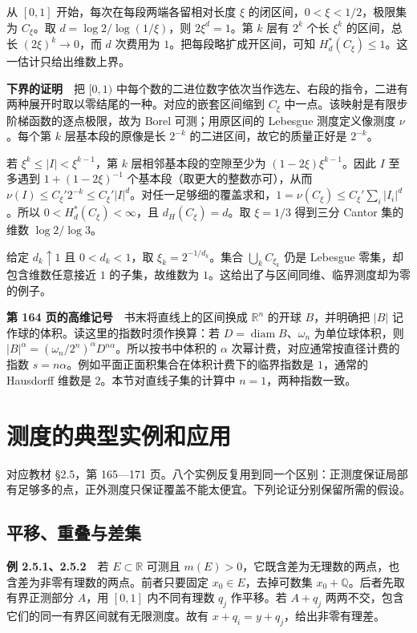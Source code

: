 \documentclass[11pt,a4paper]{article}
\begin{document}
从 \([0,1]\) 开始，每次在每段两端各留相对长度 \(\xi\) 的闭区间，\(0<\xi<1/2\)，极限集为 \(C_\xi\)。取 \(d=\log2/\log(1/\xi)\)，则 \(2\xi^d=1\)。第 \(k\) 层有 \(2^k\) 个长 \(\xi^k\) 的区间，总长 \((2\xi)^k\to0\)，而 \(d\) 次费用为 \(1\)。把每段略扩成开区间，可知 \(H^*_d(C_\xi)\leq1\)。这一估计只给出维数上界。

\textbf{下界的证明}　把 \([0,1)\) 中每个数的二进位数字依次当作选左、右段的指令，二进有两种展开时取以零结尾的一种。对应的嵌套区间缩到 \(C_\xi\) 中一点。该映射是有限步阶梯函数的逐点极限，故为 Borel 可测；用原区间的 Lebesgue 测度定义像测度 \(\nu\)。每个第 \(k\) 层基本段的原像是长 \(2^{-k}\) 的二进区间，故它的质量正好是 \(2^{-k}\)。

若 \(\xi^k\leq |I|<\xi^{k-1}\)，第 \(k\) 层相邻基本段的空隙至少为 \((1-2\xi)\xi^{k-1}\)。因此 \(I\) 至多遇到 \(1+(1-2\xi)^{-1}\) 个基本段（取更大的整数亦可），从而 \(\nu(I)\leq C_\xi'2^{-k}\leq C_\xi' |I|^d\)。对任一足够细的覆盖求和，\(1=\nu(C_\xi)\leq C_\xi'\sum_i|I_i|^d\)。所以 \(0<H^*_d(C_\xi)<\infty\)，且 \(d_H(C_\xi)=d\)。取 \(\xi=1/3\) 得到三分 Cantor 集的维数 \(\log2/\log3\)。

给定 \(d_k\uparrow1\) 且 \(0<d_k<1\)，取 \(\xi_k=2^{-1/d_k}\)。集合 \(\bigcup_k C_{\xi_k}\) 仍是 Lebesgue 零集，却包含维数任意接近 \(1\) 的子集，故维数为 \(1\)。这给出了与区间同维、临界测度却为零的例子。

\textbf{第 164 页的高维记号}　书末将直线上的区间换成 \(\mathbb R^n\) 的开球 \(B\)，并明确把 \(|B|\) 记作球的体积。读这里的指数时须作换算：若 \(D=\operatorname{diam}B\)、\(\omega_n\) 为单位球体积，则 \(|B|^\alpha=(\omega_n/2^n)^\alpha D^{n\alpha}\)。所以按书中体积的 \(\alpha\) 次幂计费，对应通常按直径计费的指数 \(s=n\alpha\)。例如平面正面积集合在体积计费下的临界指数是 \(1\)，通常的 Hausdorff 维数是 \(2\)。本节对直线子集的计算中 \(n=1\)，两种指数一致。

\section{测度的典型实例和应用}
对应教材 \S{}2.5，第 165---171 页。八个实例反复用到同一个区别：正测度保证局部有足够多的点，正外测度只保证覆盖不能太便宜。下列论证分别保留所需的假设。

\subsection*{平移、重叠与差集}\label{ux5e73ux79fbux91cdux53e0ux4e0eux5deeux96c6}

\textbf{例 2.5.1、2.5.2}　若 \(E\subset\mathbb R\) 可测且 \(m(E)>0\)，它既含差为无理数的两点，也含差为非零有理数的两点。前者只要固定 \(x_0\in E\)，去掉可数集 \(x_0+\mathbb Q\)。后者先取有界正测部分 \(A\)，用 \([0,1]\) 内不同有理数 \(q_j\) 作平移。若 \(A+q_j\) 两两不交，包含它们的同一有界区间就有无限测度。故有 \(x+q_i=y+q_j\)，给出非零有理差。
\end{document}
